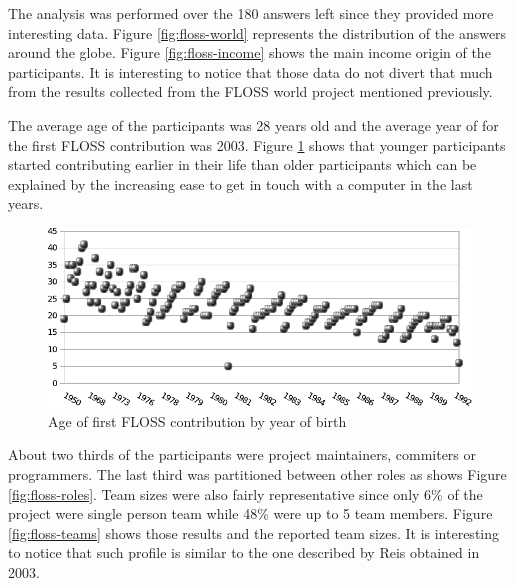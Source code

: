 \documentclass[lnbip]{svmultln}
\begin{document}
The analysis was performed over the 180 answers left since they
provided more interesting data. Figure \ref{fig:floss-world}
represents the distribution of the answers around the globe. Figure
\ref{fig:floss-income} shows the main income origin of the
participants. It is interesting to notice that those data do not
divert that much from the results collected from the FLOSS world
project mentioned previously.

The average age of the participants was 28 years old and the average
year of for the first FLOSS contribution was 2003. Figure
\ref{fig:floss-firstxp} shows that younger participants started
contributing earlier in their life than older participants which can
be explained by the increasing ease to get in touch with a computer in
the last years.

\begin{figure}[htb]
  \centering
  \includegraphics[scale=.9]{floss-firstxp.pdf}
  \caption{Age of first FLOSS contribution by year of birth}
  \label{fig:floss-firstxp}
\end{figure}

About two thirds of the participants were project maintainers,
commiters or programmers. The last third was partitioned between other
roles as shows Figure \ref{fig:floss-roles}. Team sizes were also
fairly representative since only 6\% of the project were single person
team while 48\% were up to 5 team members. Figure
\ref{fig:floss-teams} shows those results and the reported team
sizes. It is interesting to notice that such profile is similar to the
one described by Reis \cite{reis2003} obtained in 2003.
\end{document}
